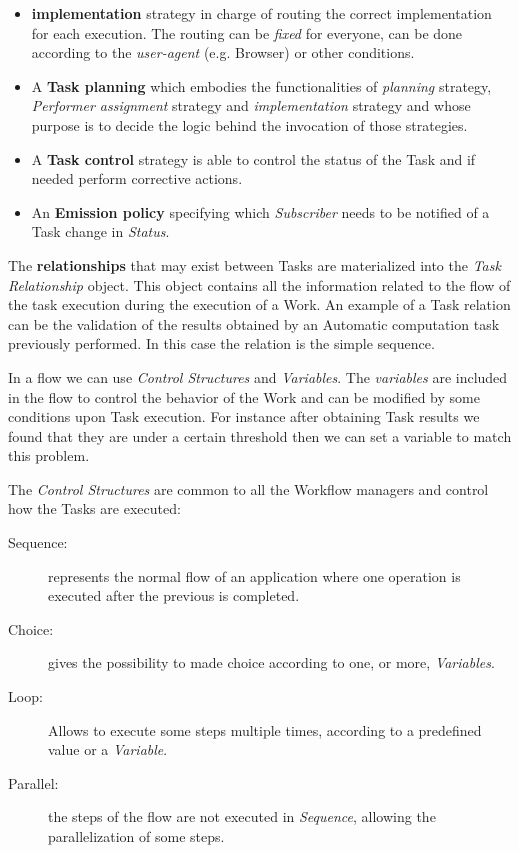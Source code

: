 \begin{itemize}
    \item \textbf{\utask{} implementation} strategy in charge of routing the
    correct \utask{} implementation for each \utask{} execution. The routing
    can be \emph{fixed} for everyone, can be done according to the
    \emph{user-agent} (e.g. Browser) or other conditions.

    \item A \textbf{Task planning} which embodies the functionalities of
    \emph{\utask{} planning} strategy, \emph{Performer assignment} strategy and
    \emph{\utask{} implementation} strategy and whose purpose is to decide the 
    logic behind the invocation of those strategies.

    \item A \textbf{Task control} strategy is able to control the status of the
    Task and if needed perform corrective actions.

    \item An \textbf{Emission policy} specifying which \emph{Subscriber} needs to
    be notified of a Task change in \emph{Status}.
\end{itemize}


The \textbf{relationships} that may exist between Tasks are materialized into the
\emph{Task Relationship} object. This object contains all the information related
to the flow of the task execution during the execution of a Work. An example of
a Task relation can be the validation of the results obtained by an Automatic
computation task previously performed. In this case the relation is the simple
sequence.

In a flow we can use \emph{Control Structures} and \emph{Variables}. The
\emph{variables} are included in the flow to control the behavior of the Work
and can be modified by some conditions upon Task execution. For instance after
obtaining Task results we found that they are under a certain threshold then we
can set a variable to match this problem.

The \emph{Control Structures} are common to all the Workflow managers and 
control how the Tasks are executed:
\begin{description}
     \item[Sequence:] represents the normal flow of an application where one
     operation is executed after the previous is completed.
     \item[Choice:] gives the possibility to made choice according to one, or
     more, \emph{Variables}.
     \item[Loop:] Allows to execute some steps multiple times, according to a
     predefined value or a \emph{Variable}.
     \item[Parallel:] the steps of the flow are not executed in \emph{Sequence},
     allowing the parallelization of some steps.
 \end{description} 









